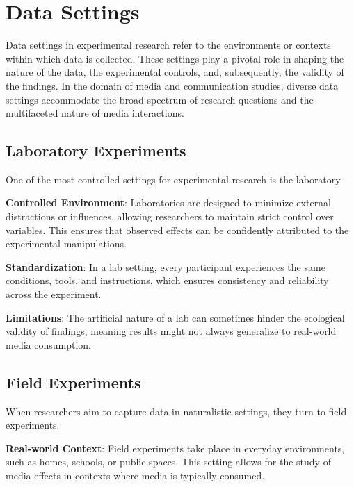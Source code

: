 \documentclass[
  b5paper]{book}
\begin{document}
\hypertarget{data-settings}{%
\section{Data Settings}\label{data-settings}}

Data settings in experimental research refer to the environments or contexts within which data is collected. These settings play a pivotal role in shaping the nature of the data, the experimental controls, and, subsequently, the validity of the findings. In the domain of media and communication studies, diverse data settings accommodate the broad spectrum of research questions and the multifaceted nature of media interactions.

\hypertarget{laboratory-experiments}{%
\subsection*{Laboratory Experiments}\label{laboratory-experiments}}

One of the most controlled settings for experimental research is the laboratory.

\textbf{Controlled Environment}: Laboratories are designed to minimize external distractions or influences, allowing researchers to maintain strict control over variables. This ensures that observed effects can be confidently attributed to the experimental manipulations.

\textbf{Standardization}: In a lab setting, every participant experiences the same conditions, tools, and instructions, which ensures consistency and reliability across the experiment.

\textbf{Limitations}: The artificial nature of a lab can sometimes hinder the ecological validity of findings, meaning results might not always generalize to real-world media consumption.

\hypertarget{field-experiments}{%
\subsection*{Field Experiments}\label{field-experiments}}

When researchers aim to capture data in naturalistic settings, they turn to field experiments.

\textbf{Real-world Context}: Field experiments take place in everyday environments, such as homes, schools, or public spaces. This setting allows for the study of media effects in contexts where media is typically consumed.
\end{document}
